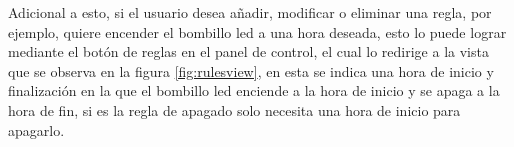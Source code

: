 \begin{frame}
%

Adicional a esto, si el usuario desea añadir, modificar o eliminar una regla, por ejemplo, quiere encender el bombillo led a una hora deseada, esto lo puede lograr mediante el botón de reglas en el panel de control, el cual lo redirige a la vista que se observa en la figura \ref{fig:rulesview}, en esta se indica una hora de inicio y finalización en la que el bombillo led enciende a la hora de inicio y se apaga a la hora de fin, si es la regla de apagado solo necesita una hora de inicio para apagarlo.\\


\end{frame}

